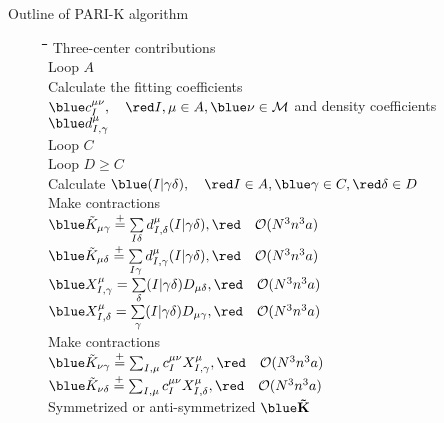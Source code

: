 \begin{frame}{\small Outline of PARI-K algorithm}
\footnotesize
\begin{figure}
\begin{tabbing}
\hspace{3pt}\=\hspace{10pt}\=\hspace{10pt}\=\hspace{10pt}\=\hspace{10pt}\=\hspace{10pt}\=\hspace{10pt}\=\hspace{10pt}\=\hspace{10pt}\=\hspace{10pt}\kill
\> {\blue Three-center contributions} \\
\> Loop $A$ \\
\> \> Calculate the fitting coefficients $\blue c_I^{\mu\nu}, \quad \red I,\mu\in A, \blue \nu\in {\cal M}$ and density coefficients $\blue d_{I,\gamma}^\mu $ \\
\> \> Loop $C$ \\
\> \> \> Loop $D\ge C$ \\
\> \> \> \> Calculate $\blue (I|\gamma\delta), \quad \red I\in A,\blue\gamma\in C, \red\delta\in D$ \\
\> \> \> \> Make contractions \\
\> \> \> \> \> $\blue \tilde K_{\mu\gamma} \stackrel{+}{=} \sum\limits_{I\delta} d_{I,\delta}^\mu (I|\gamma\delta), \red \quad {\cal O}(N^3 n^3 a)$ \\
\> \> \> \> \> $\blue \tilde K_{\mu\delta} \stackrel{+}{=} \sum\limits_{I\gamma} d_{I,\gamma}^\mu (I|\gamma\delta), \red \quad {\cal O}(N^3 n^3 a)$ \\
\> \> \> \> \> $\blue X_{I,\gamma}^\mu = \sum\limits_\delta (I|\gamma\delta)D_{\mu\delta}, \red \quad {\cal O}(N^3 n^3 a)$ \\
\> \> \> \> \> $\blue X_{I,\delta}^\mu = \sum\limits_\gamma (I|\gamma\delta)D_{\mu\gamma}, \red \quad {\cal O}(N^3 n^3 a)$ \\
\> \> Make contractions \\
\> \> \> $\blue \tilde K_{\nu \gamma} \stackrel{+}{=} \sum_{I,\mu} c_{I}^{\mu\nu} X_{I,\gamma}^\mu, \red \quad {\cal O}(N^3 n^3 a)$ \\
\> \> \> $\blue \tilde K_{\nu \delta} \stackrel{+}{=} \sum_{I,\mu} c_{I}^{\mu\nu} X_{I,\delta}^\mu, \red \quad {\cal O}(N^3 n^3 a)$ \\
\> Symmetrized or anti-symmetrized $\blue \mathbf{\tilde K}$ \\
\end{tabbing}
\end{figure}
\end{frame}


